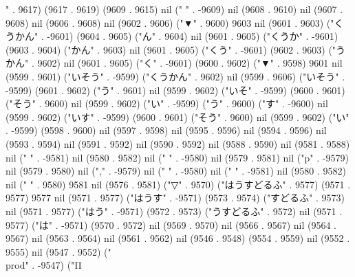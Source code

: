 " . 9617) (9617 . 9619) (9609 . 9615) nil (" " . -9609) nil (9608 . 9610) nil (9607 . 9608) nil (9606 . 9608) nil (9602 . 9606) ("▼" . 9600) 9603 nil (9601 . 9603) ("くうかん" . -9601) (9604 . 9605) ("ん" . 9604) nil (9601 . 9605) ("くうか" . -9601) (9603 . 9604) ("かん" . 9603) nil (9601 . 9605) ("くう" . -9601) (9602 . 9603) ("うかん" . 9602) nil (9601 . 9605) ("く" . -9601) (9600 . 9602) ("▼" . 9598) 9601 nil (9599 . 9601) ("いそう" . -9599) ("くうかん" . 9602) nil (9599 . 9606) ("いそう" . -9599) (9601 . 9602) ("う" . 9601) nil (9599 . 9602) ("いそ" . -9599) (9600 . 9601) ("そう" . 9600) nil (9599 . 9602) ("い" . -9599) ("う" . 9600) ("す" . -9600) nil (9599 . 9602) ("いす" . -9599) (9600 . 9601) ("そう" . 9600) nil (9599 . 9602) ("い" . -9599) (9598 . 9600) nil (9597 . 9598) nil (9595 . 9596) nil (9594 . 9596) nil (9593 . 9594) nil (9591 . 9592) nil (9590 . 9592) nil (9588 . 9590) nil (9581 . 9588) nil (" " . -9581) nil (9580 . 9582) nil (" " . -9580) nil (9579 . 9581) nil ("p" . -9579) nil (9579 . 9580) nil ("," . -9579) nil ("
" . -9580) nil (" " . -9581) nil (9580 . 9582) nil (" " . 9580) 9581 nil (9576 . 9581) ("▽" . 9570) ("はうすどるふ" . 9577) (9571 . 9577) 9577 nil (9571 . 9577) ("はうす" . -9571) (9573 . 9574) ("すどるふ" . 9573) nil (9571 . 9577) ("はう" . -9571) (9572 . 9573) ("うすどるふ" . 9572) nil (9571 . 9577) ("は" . -9571) (9570 . 9572) nil (9569 . 9570) nil (9566 . 9567) nil (9564 . 9567) nil (9563 . 9564) nil (9561 . 9562) nil (9546 . 9548) (9554 . 9559) nil (9552 . 9555) nil (9547 . 9552) ("\\prod" . -9547) ("Π
